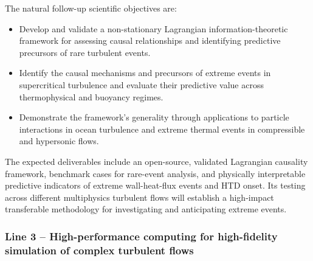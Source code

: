 \documentclass[11pt]{article}
\begin{document}
The natural follow-up scientific objectives are:
\begin{itemize}
	\item[\textbf{O4.}] Develop and validate a non-stationary Lagrangian information-theoretic framework for assessing causal relationships and identifying predictive precursors of rare turbulent events.
	\item[\textbf{O5.}] Identify the causal mechanisms and precursors of extreme events in supercritical turbulence and evaluate their predictive value across thermophysical and buoyancy regimes.
	\item[\textbf{O6.}] Demonstrate the framework's generality through applications to particle interactions in ocean turbulence and extreme thermal events in compressible and hypersonic flows.
\end{itemize}
The expected deliverables include an open-source, validated Lagrangian causality framework, benchmark cases for rare-event analysis, and physically interpretable predictive indicators of extreme wall-heat-flux events and HTD onset.
Its testing across different multiphysics turbulent flows will establish a high-impact transferable methodology for investigating and anticipating extreme events.

\subsubsection{Line 3 -- High-performance computing for high-fidelity simulation of complex turbulent flows}
\end{document}
